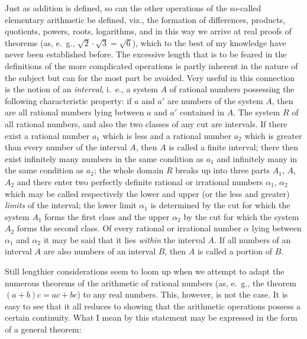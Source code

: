 \documentclass[polutonikogreek,english,twoside,openright]{article}
\begin{document}
Just as addition is defined, so can the other operations of the
so-called elementary arithmetic be defined, viz., the formation of
differences, products, quotients, powers, roots, logarithms, and in
this way we arrive at real proofs of theorems (as, e.~g.,
$\sqrt{2}\cdot\sqrt{3} =\sqrt{6}$), which to the best of my knowledge
have never been established before. The excessive length that is to be
feared in the definitions of the more complicated operations is partly
inherent in the nature of the subject but can for the most part be
avoided. Very useful in this connection is the notion of an
\textit{interval}, i.~e., a system $A$ of rational numbers possessing
the following characteristic property: if $a$ and $a'$ are numbers of
the system $A$, then are all rational numbers lying between $a$ and
$a'$ contained in $A$. The system $R$ of all rational numbers, and
also the two classes of any cut are intervals. If there exist a
rational number $a_1$ which is less and a rational number $a_2$ which
is greater than every number of the interval $A$, then $A$ is called a
finite interval; there then exist infinitely many numbers in the same
condition as $a_1$ and infinitely many in the same condition as $a_2$;
the whole domain $R$ breaks up into three parts $A_1$, $A$, $A_2$ and
there enter two perfectly definite rational or irrational numbers
$\alpha_1$, $\alpha_2$ which may be called respectively the lower and
upper (or the less and greater) \textit{limits} of the interval; the
lower limit $\alpha_1$ is determined by the cut for which the system
$A_1$ forms the first class and the upper $\alpha_2$ by the cut for
which the system $A_2$ forms the second class.  Of every rational or
irrational number $\alpha$ lying between $\alpha_1$ and $\alpha_2$ it
may be said that it lies \textit{within} the interval $A$. If all
numbers of an interval $A$ are also numbers of an interval $B$, then
$A$ is called a portion of $B$.

Still lengthier considerations seem to loom up when we attempt to
adapt the numerous theorems of the arithmetic of rational numbers (as,
e.~g., the theorem $(a+b)c=ac+bc$) to any real numbers. This, however,
is not the case. It is easy to see that it all reduces to showing that
the arithmetic operations possess a certain continuity. What I mean by
this statement may be expressed in the form of a general theorem:
\end{document}
